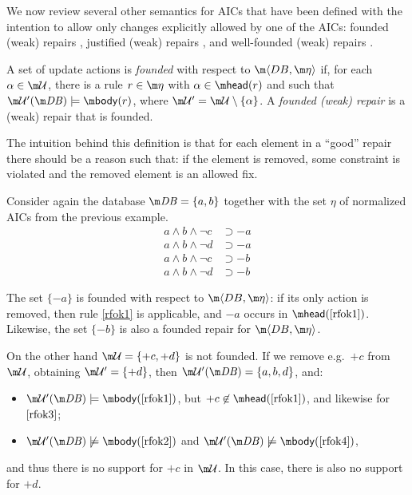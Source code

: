  We now review several other semantics for AICs that have been defined with the intention to allow only changes explicitly allowed by one of the AICs: founded (weak) repairs \cite{iclp/CaropreseGSZ06}, justified (weak) repairs \cite{tplp/CaropreseT11}, and well-founded (weak) repairs \cite{tase/Cruz-FilipeGEN13}.

\begin{definition}
 A set of update actions \UU is \emph{founded} with respect to $\fulldb$ if, for each $\alpha \in \UU$, there is a rule  $r\in \aics$ with $\alpha\in\head(r)$ and such that $\UU'(\db)\models \body(r)$, where $\UU'=\UU\setminus\{\alpha\}$. A \emph{founded (weak) repair} is a (weak) repair that is founded.
\end{definition}

The intuition behind this definition is that for each element in a ``good'' repair there should be a reason such that: if the element is removed, some constraint is violated and the removed element is an allowed fix. 


\begin{example}
  Consider again the database $\db=\{a,b\}$ together with the set $\eta$ of normalized AICs from the previous example.
  \begin{align}
    a\land b\land\neg c &\supset{-a} \label{rfok1} \\
    a\land b\land\neg d &\supset{-a} \label{rfok2} \\
    a\land b\land\neg c &\supset{-b} \label{rfok3} \\
    a\land b\land\neg d &\supset{-b} \label{rfok4}
  \end{align}

  The set $\{{-a}\}$ is founded with respect to $\fulldb$: if its only action is removed, then rule \ref{rfok1} is applicable, and ${-a}$ occurs in $\head(\ref{rfok1})$.
  Likewise, the set $\{{-b}\}$ is also a founded repair for $\fulldb$.

  On the other hand $\UU=\{{+c},{+d}\}$ is not founded.
  If we remove e.g.~${+c}$ from $\UU$, obtaining $\UU'=\{+d\}$, then $\UU'(\db)=\{a,b,d\}$, and:
  \begin{itemize}
  \item $\UU'(\db)\models\body(\ref{rfok1})$, but ${+c}\not\in\head(\ref{rfok1})$, and likewise for $\ref{rfok3}$;
  \item $\UU'(\db)\not\models\body(\ref{rfok2})$ and $\UU'(\db)\not\models\body(\ref{rfok4})$,
  \end{itemize}
  and thus there is no support for ${+c}$ in $\UU$.
  In this case, there is also no support for ${+d}$.
\end{example}


